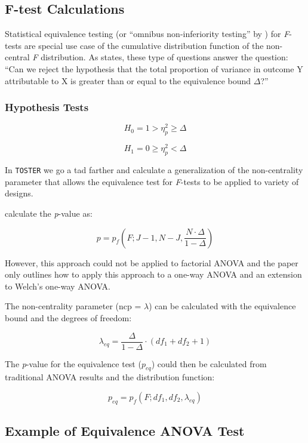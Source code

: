\documentclass[]{interact}
\theoremstyle{plain}%
\theoremstyle{definition}
\theoremstyle{remark}
\begin{document}
\hypertarget{f-test-calculations}{%
\subsection{F-test Calculations}\label{f-test-calculations}}

Statistical equivalence testing (or ``omnibus non-inferiority testing''
by \citet{Campbell_2021}) for \emph{F}-tests are special use case of the
cumulative distribution function of the non-central \emph{F}
distribution. As \citet{Campbell_2021} states, these type of questions
answer the question: ``Can we reject the hypothesis that the total
proportion of variance in outcome Y attributable to X is greater than or
equal to the equivalence bound \(\Delta\)?''

\hypertarget{hypothesis-tests}{%
\subsubsection{Hypothesis Tests}\label{hypothesis-tests}}

\[
H_0 =  1 > \eta^2_p \geq \Delta
\]

\[
H_1 =  0 \geq \eta^2_p < \Delta
\]

In \texttt{TOSTER} we go a tad farther and calculate a generalization of
the non-centrality parameter that allows the equivalence test for
\emph{F}-tests to be applied to variety of designs.

\citet{Campbell_2021} calculate the \emph{p}-value as:

\[
p = p_f(F; J-1, N-J, \frac{N \cdot \Delta}{1-\Delta})
\]

However, this approach could not be applied to factorial ANOVA and the
paper only outlines how to apply this approach to a one-way ANOVA and an
extension to Welch's one-way ANOVA.

The non-centrality parameter (ncp = \(\lambda\)) can be calculated with
the equivalence bound and the degrees of freedom:

\[
\lambda_{eq} = \frac{\Delta}{1-\Delta} \cdot(df_1 + df_2 +1)
\]

The \emph{p}-value for the equivalence test (\(p_{eq}\)) could then be
calculated from traditional ANOVA results and the distribution function:

\[
p_{eq} = p_f(F; df_1, df_2, \lambda_{eq})
\]

\hypertarget{example-of-equivalence-anova-test}{%
\subsection{Example of Equivalence ANOVA
Test}\label{example-of-equivalence-anova-test}}
\end{document}
